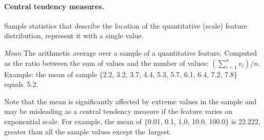 \paragraph{Central tendency measures.}
Sample statistics that describe the location of the quantitative (scale) feature distribution,
represent it with a single value.
\begin{Description}
\item[\it Mean]
\OutputRowText{\OutputRowIDMean}
The arithmetic average over a sample of a quantitative feature.
Computed as the ratio between the sum of values and the number of values:
$\left(\sum_{i=1}^n v_i\right)\!/n$.
Example: the mean of sample $\{$2.2, 3.2, 3.7, 4.4, 5.3, 5.7, 6.1, 6.4, 7.2, 7.8$\}$
equals~5.2.

Note that the mean is significantly affected by extreme values in the sample
and may be misleading as a central tendency measure if the feature varies on
exponential scale.  For example, the mean of $\{$0.01, 0.1, 1.0, 10.0, 100.0$\}$
is 22.222, greater than all the sample values except the~largest.


\end{Description}
